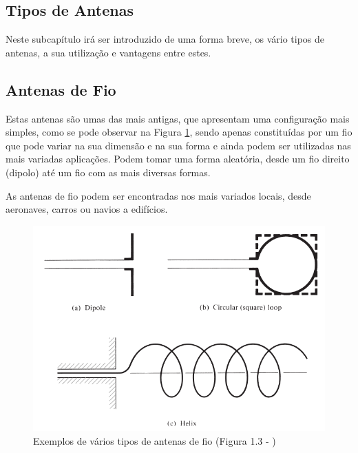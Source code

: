 \subsection{Tipos de Antenas}
Neste subcapítulo irá ser introduzido de uma forma breve, os vário tipos de antenas, a sua utilização e vantagens entre estes. 

\subsection*{Antenas de Fio}
Estas antenas são umas das mais antigas, que apresentam uma configuração mais simples, como se pode observar na Figura \ref{fig:wire antenna}, sendo apenas constituídas por um fio que pode variar na sua dimensão e na sua forma e ainda podem ser utilizadas nas mais variadas aplicações. Podem tomar uma forma aleatória, desde um fio direito (dipolo) até um fio com as mais diversas formas. \par 
As antenas de fio podem ser encontradas nos mais variados locais, desde aeronaves, carros ou navios a edifícios.

\begin{figure}[h]
\centering
\includegraphics[scale=0.6]{chapters/ch3/assets/wire_antenna}
\caption[Antena de Fio]{Exemplos de vários tipos de antenas de fio (Figura 1.3 - \cite{Balanis2016})}
\label{fig:wire antenna}
\end{figure}

